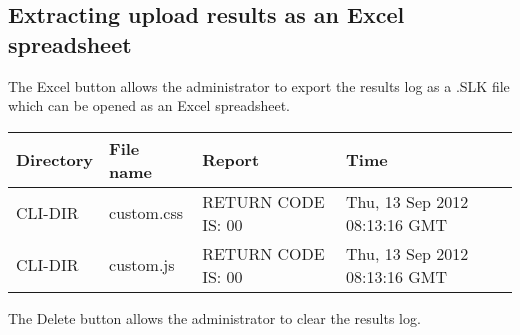 \documentclass[letterpaper,10pt,english]{sphinxmanual}
\begin{document}


\ignorespaces 

\subsection{Extracting upload results as an Excel spreadsheet}
\label{\detokenize{audit_operations_ and_performance:extracting-upload-results-as-an-excel-spreadsheet}}\label{\detokenize{audit_operations_ and_performance:index-60}}
 The Excel button allows the administrator to export the results log as a .SLK file which can be opened as an Excel spreadsheet.


\begin{savenotes}\sphinxattablestart
\centering
\begin{tabulary}{\linewidth}[t]{|T|T|T|T|}
\hline
\sphinxstyletheadfamily 
Directory
&\sphinxstyletheadfamily 
File name
&\sphinxstyletheadfamily 
Report
&\sphinxstyletheadfamily 
Time
\\
\hline
CLI-DIR
&
custom.css
&
RETURN CODE IS: 00
&
Thu, 13 Sep 2012 08:13:16 GMT
\\
\hline
CLI-DIR
&
custom.js
&
RETURN CODE IS: 00
&
Thu, 13 Sep 2012 08:13:16 GMT
\\
\hline
\end{tabulary}
\par
\sphinxattableend\end{savenotes}

 The Delete button allows the administrator to clear the results log.
\begin{quote}

\ignorespaces 
{}\ignorespaces \end{quote}
\end{document}
